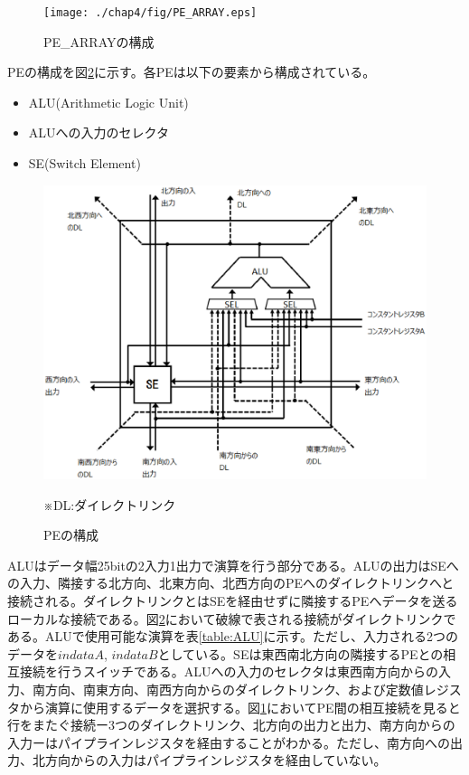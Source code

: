 {\begin{figure}[p]
\centering
\texttt{[image: ./chap4/fig/PE\_ARRAY.eps]}
\caption{PE\_ARRAYの構成}
\label{fig:pe_array}
\end{figure}

PEの構成を図\ref{fig:pe}に示す。各PEは以下の要素から構成されている。
\begin{itemize}
\item ALU(Arithmetic Logic Unit)
\item ALUへの入力のセレクタ
\item SE(Switch Element)
\end{itemize}

\begin{figure}[h]
\centering
\includegraphics[scale=0.5]{./chap4/fig/PE_detail.eps}
\\ \begin{flushleft}※DL:ダイレクトリンク\end{flushleft}
\caption{PEの構成}
\label{fig:pe}
\end{figure}

ALUはデータ幅25bitの2入力1出力で演算を行う部分である。ALUの出力はSEへの入力、隣接する北方向、北東方向、北西方向のPEへのダイレクトリンクへと接続される。ダイレクトリンクとはSEを経由せずに隣接するPEへデータを送るローカルな接続である。図\ref{fig:pe}において破線で表される接続がダイレクトリンクである。ALUで使用可能な演算を表\ref{table:ALU}に示す。ただし、入力される2つのデータを$indataA$, $indataB$としている。SEは東西南北方向の隣接するPEとの相互接続を行うスイッチである。ALUへの入力のセレクタは東西南方向からの入力、南方向、南東方向、南西方向からのダイレクトリンク、および定数値レジスタから演算に使用するデータを選択する。図\ref{fig:pe_array}においてPE間の相互接続を見ると行をまたぐ接続ー3つのダイレクトリンク、北方向の出力と出力、南方向からの入力ーはパイプラインレジスタを経由することがわかる。ただし、南方向への出力、北方向からの入力はパイプラインレジスタを経由していない。

}
